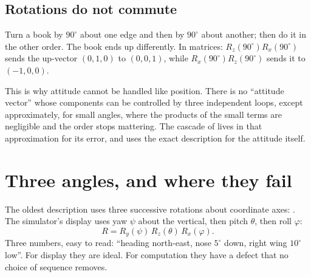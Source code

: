 
\subsection{Rotations do not commute}
Turn a book by $90^\circ$ about one edge and then by $90^\circ$ about another; then do it in the other order. The book ends up differently. In matrices: $R_z(90^\circ)R_x(90^\circ)$ sends the up-vector $(0, 1, 0)$ to $(0, 0, 1)$, while $R_x(90^\circ)R_z(90^\circ)$ sends it to $(-1, 0, 0)$.

This is why attitude cannot be handled like position. There is no \enquote{attitude vector} whose components can be controlled by three independent loops, except approximately, for small angles, where the products of the small terms are negligible and the order stops mattering. The cascade of  lives in that approximation for its error, and uses the exact description for the attitude itself.

\section{Three angles, and where they fail}

The oldest description uses three successive rotations about coordinate axes: . The simulator's display uses yaw $\psi$ about the vertical, then pitch $\theta$, then roll $\varphi$:
\begin{equation}\label{eq:H-euler}
  R = R_y(\psi)\,R_z(\theta)\,R_x(\varphi) .
\end{equation}
Three numbers, easy to read: \enquote{heading north-east, nose $5^\circ$ down, right wing $10^\circ$ low}. For display they are ideal. For computation they have a defect that no choice of sequence removes.

